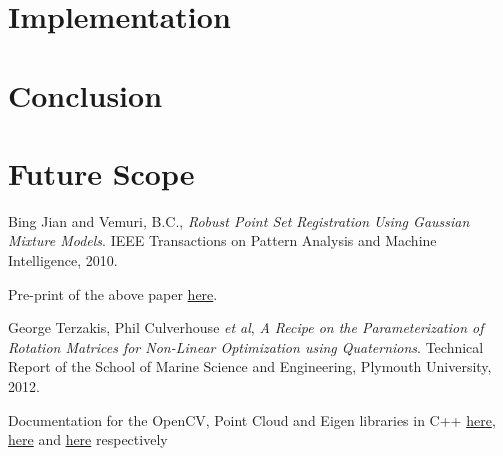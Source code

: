 \documentclass[11pt, a4paper]{article}
\begin{document}
\section{Implementation}

\section{Conclusion}

\section{Future Scope}


\begin{thebibliography}{9}

  Bing Jian and Vemuri, B.C.,
  \emph{Robust Point Set Registration Using Gaussian Mixture Models}.
  IEEE Transactions on Pattern Analysis and Machine Intelligence,
  2010.
  
  Pre-print of the above paper \href{http://code.google.com/p/gmmreg/downloads/detail?name=gmmreg_PAMI_preprint.pdf}{here}.
  
  George Terzakis, Phil Culverhouse \textit{et al},
  \emph{A Recipe on the Parameterization of Rotation Matrices for Non-Linear Optimization using Quaternions}.
  Technical Report of the School of Marine Science and Engineering, Plymouth University,
  2012.
  
  Documentation for the OpenCV, Point Cloud and Eigen libraries in C++ \href{http://docs.opencv.org/}{here}, \href{http://pointclouds.org/documentation/}{here} and \href{http://eigen.tuxfamily.org/dox/}{here} respectively

\end{thebibliography}
\end{document}
